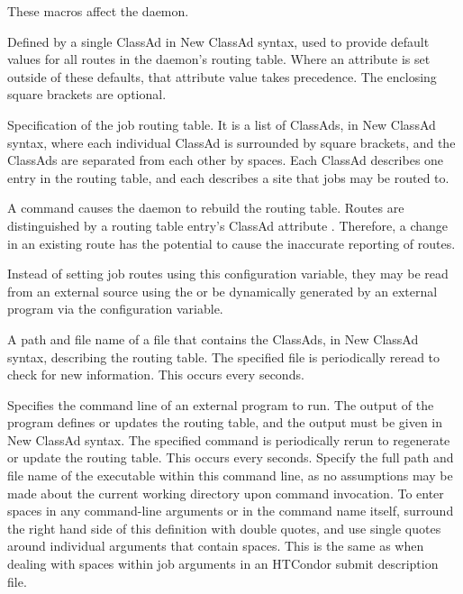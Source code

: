 These macros affect the  daemon.

\begin{description}

\label{param:JobRouterDefaults}
\item[\Macro{JOB\_ROUTER\_DEFAULTS}]
  Defined by a single ClassAd in New ClassAd syntax, 
  used to provide default values for all routes in the 
  daemon's routing table.
  Where an attribute is set outside of these defaults,
  that attribute value takes precedence.
  The enclosing square brackets are optional.

\label{param:JobRouterEntries}
\item[\Macro{JOB\_ROUTER\_ENTRIES}]
  Specification of the job routing table.  It is a list of ClassAds,
  in New ClassAd syntax,
  where each individual ClassAd is surrounded by square brackets,
  and the ClassAds are separated from each other by spaces.
  Each ClassAd describes one entry in the routing table,
  and each describes a site that jobs may be routed to.

  A  command causes the  daemon
  to rebuild the routing table.
  Routes are distinguished by a routing table entry's ClassAd attribute
  .
  Therefore, a  change in an existing route has the potential to
  cause the inaccurate reporting of routes.

  Instead of setting job routes using this configuration variable,
  they may be read from an
  external source using the  or
  be dynamically generated by an external program via the
   configuration variable.


\label{param:JobRouterEntriesFile}
\item[\Macro{JOB\_ROUTER\_ENTRIES\_FILE}]
  A path and file name of a file that contains the ClassAds,
  in New ClassAd syntax, describing the routing table.
  The specified file is periodically reread to check for new information.
  This occurs every  seconds.

\label{param:JobRouterEntriesCmd}
\item[\Macro{JOB\_ROUTER\_ENTRIES\_CMD}]
  Specifies the command line of an external program
  to run.  The output of the program defines or updates the routing table,
  and the output must be given in New ClassAd syntax.
  The specified command is periodically rerun to regenerate or update
  the routing table.
  This occurs every  seconds.
  Specify the full path and file name of the executable within this
  command line, as no assumptions may be made about the current working
  directory upon command invocation.
  To enter spaces in any command-line arguments or in the command name itself,
  surround the right hand side of this definition with double quotes,
  and use single quotes around individual arguments that contain spaces.
  This is the same as when dealing with spaces within job arguments
  in an HTCondor submit description file. 


\end{description}
